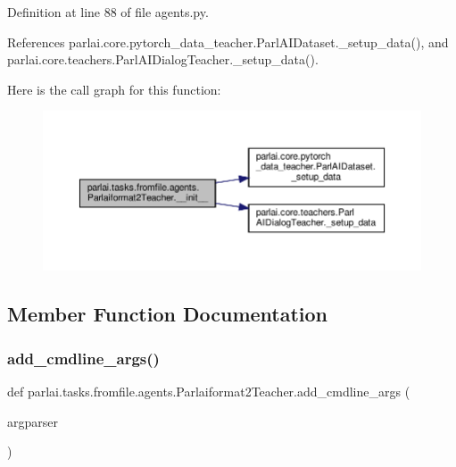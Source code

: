 Definition at line 88 of file agents.\+py.



References parlai.\+core.\+pytorch\+\_\+data\+\_\+teacher.\+Parl\+A\+I\+Dataset.\+\_\+setup\+\_\+data(), and parlai.\+core.\+teachers.\+Parl\+A\+I\+Dialog\+Teacher.\+\_\+setup\+\_\+data().

Here is the call graph for this function\+:
\nopagebreak
\begin{figure}[H]
\begin{center}
\leavevmode
\includegraphics[width=350pt]{classparlai_1_1tasks_1_1fromfile_1_1agents_1_1Parlaiformat2Teacher_a18904cf2f5851ea2f1ee37136a0efb2b_cgraph}
\end{center}
\end{figure}


\subsection{Member Function Documentation}
\mbox{\label{classparlai_1_1tasks_1_1fromfile_1_1agents_1_1Parlaiformat2Teacher_adbba4165f1d6690562c545fb48d1af06}} 
\subsubsection{\texorpdfstring{add\+\_\+cmdline\+\_\+args()}{add\_cmdline\_args()}}
{\footnotesize\ttfamily def parlai.\+tasks.\+fromfile.\+agents.\+Parlaiformat2\+Teacher.\+add\+\_\+cmdline\+\_\+args (\begin{DoxyParamCaption}\item[{}]{argparser }\end{DoxyParamCaption})\hspace{0.3cm}{\ttfamily [static]}}



